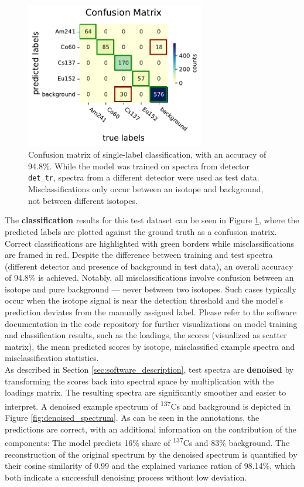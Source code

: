 \documentclass[preprint,12pt, a4paper]{elsarticle}
\begin{document}
\begin{figure}
\centering
\includegraphics[width=0.7\textwidth]{Confusion_matrix_.pdf}
\caption{Confusion matrix of single-label classification, with an accuracy of 94.8\%. While the model was trained on spectra from detector \texttt{det\_tr}, spectra from a different detector were used as test data. Misclassifications only occur between an isotope and background, not between different isotopes.}
\label{fig:confusion_matrix}
\end{figure}

The \textbf{classification} results for this test dataset can be seen in Figure \ref{fig:confusion_matrix}, where the predicted labels are plotted against the ground truth as a confusion matrix. Correct classifications are highlighted with green borders while misclassifications are framed in red. Despite the difference between training and test spectra (different detector and presence of background in test data), an overall accuracy of 94.8\% is achieved. Notably, all misclassifications involve confusion between an isotope and pure background — never between two isotopes. Such cases typically occur when the isotope signal is near the detection threshold and the model's prediction deviates from the manually assigned label. Please refer to the software documentation in the code repository for further visualizations on model training and classification results, such as the loadings, the scores (visualized as scatter matrix), the mean predicted scores by isotope, misclassified example spectra and misclassification statistics. \\

As described in Section \ref{sec:software_description}, test spectra are \textbf{denoised} by transforming the scores back into spectral space by multiplication with the loadings matrix. The resulting spectra are significantly smoother and easier to interpret. A denoised example spectrum of \textsuperscript{137}Cs and background is depicted in Figure \ref{fig:denoised_spectrum}. As can be seen in the annotations, the predictions are correct, with an additional information on the contribution of the components: The model predicts 16\% share of \textsuperscript{137}Cs and 83\% background. The reconstruction of the original spectrum by the denoised spectrum is quantified by their cosine similarity of 0.99 and the explained variance ration of 98.14\%, which both indicate a successfull denoising process without low deviation. \\
\end{document}
